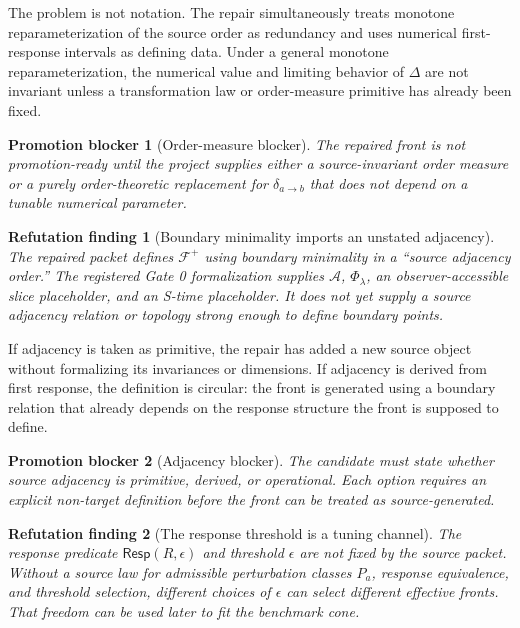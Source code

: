 \documentclass[11pt]{article}
\newcommand{\Sub}{\mathcal{A}}
\newcommand{\Front}{\mathcal{F}}
\newtheorem{refutationfinding}{Refutation finding}
\newtheorem{blocker}{Promotion blocker}
\begin{document}
The problem is not notation. The repair simultaneously treats monotone
reparameterization of the source order as redundancy and uses numerical
first-response intervals as defining data. Under a general monotone
reparameterization, the numerical value and limiting behavior of \(\Delta\)
are not invariant unless a transformation law or order-measure primitive has
already been fixed.

\begin{blocker}[Order-measure blocker]
The repaired front is not promotion-ready until the project supplies either a
source-invariant order measure or a purely order-theoretic replacement for
\(\delta_{a\to b}\) that does not depend on a tunable numerical parameter.
\end{blocker}

\begin{refutationfinding}[Boundary minimality imports an unstated adjacency]
The repaired packet defines \(\Front^{+}\) using boundary minimality in a
``source adjacency order.'' The registered Gate 0 formalization supplies
\(\Sub\), \(\Phi_{\lambda}\), an observer-accessible slice placeholder, and an
S-time placeholder. It does not yet supply a source adjacency relation or
topology strong enough to define boundary points.
\end{refutationfinding}

If adjacency is taken as primitive, the repair has added a new source object
without formalizing its invariances or dimensions. If adjacency is derived from
first response, the definition is circular: the front is generated using a
boundary relation that already depends on the response structure the front is
supposed to define.

\begin{blocker}[Adjacency blocker]
The candidate must state whether source adjacency is primitive, derived, or
operational. Each option requires an explicit non-target definition before the
front can be treated as source-generated.
\end{blocker}

\begin{refutationfinding}[The response threshold is a tuning channel]
The response predicate \(\mathsf{Resp}(R,\epsilon)\) and threshold
\(\epsilon\) are not fixed by the source packet. Without a source law for
admissible perturbation classes \(P_a\), response equivalence, and threshold
selection, different choices of \(\epsilon\) can select different effective
fronts. That freedom can be used later to fit the benchmark cone.
\end{refutationfinding}
\end{document}
